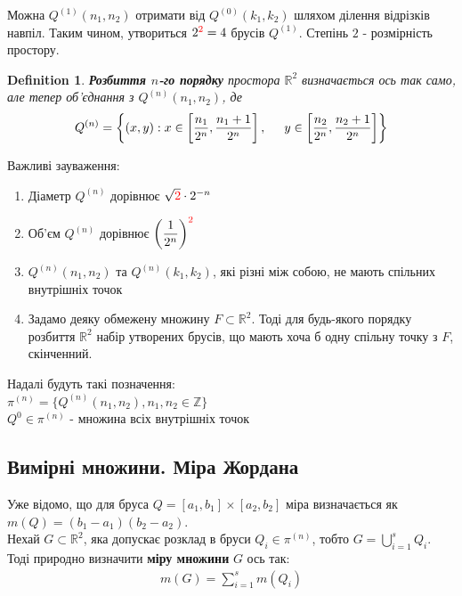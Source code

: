 \documentclass[a4paper, 10pt]{article}
\theoremstyle{theoremdd}
\theoremstyle{theoremdd}
\newtheorem{definition}[theorem]{Definition}
\theoremstyle{theoremdd}
\theoremstyle{theoremdd}
\theoremstyle{theoremdd}
\theoremstyle{theoremdd}
\theoremstyle{theoremdd}
\theoremstyle{theoremdd}
\begin{document}
Можна $Q^{(1)}(n_1,n_2)$ отримати від $Q^{(0)}(k_1,k_2)$ шляхом ділення відрізків навпіл. Таким чином, утвориться $2^{\textcolor{red}{2}} = 4$ брусів $Q^{(1)}$. Степінь $2$ - розмірність простору.

\begin{definition}
\textbf{Розбиття $n$-го порядку} простора $\mathbb{R}^2$ визначається ось так само, але тепер об'єднання з $Q^{(n)}(n_1,n_2)$, де
\begin{align*}
Q^{(n)} = \left\{ (x,y): x \in \left[\dfrac{n_1}{2^n},\dfrac{n_1+1}{2^n} \right], \hspace{0.5cm} y \in \left[\dfrac{n_2}{2^n},\dfrac{n_2+1}{2^n} \right] \right\}
\end{align*}
\end{definition}

Важливі зауваження:
\begin{enumerate}
\item Діаметр $Q^{(n)}$ дорівнює $\sqrt{\textcolor{red}{2}} \cdot 2^{-n}$
\item Об'єм $Q^{(n)}$ дорівнює $\left( \dfrac{1}{2^n} \right)^{\textcolor{red}{2}}$
\item $Q^{(n)}(n_1,n_2)$ та $Q^{(n)}(k_1,k_2)$, які різні між собою, не мають спільних внутрішніх точок
\item Задамо деяку обмежену множину $F \subset \mathbb{R}^2$. Тоді для будь-якого порядку розбиття $\mathbb{R}^2$ набір утворених брусів, що мають хоча б одну спільну точку з $F$, скінченний.
\end{enumerate}

Надалі будуть такі позначення:\\
$\pi^{(n)} = \{ Q^{(n)}(n_1,n_2), n_1,n_2 \in \mathbb{Z}\}$\\
$Q^0 \in \pi^{(n)}$ - множина всіх внутрішніх точок

\subsection{Вимірні множини. Міра Жордана}
Уже відомо, що для бруса $Q = [a_1,b_1] \times [a_2,b_2]$ міра визначається як $m(Q) = (b_1-a_1)(b_2-a_2)$.
\bigskip \\
Нехай $G \subset \mathbb{R}^2$, яка допускає розклад в бруси $Q_i \in \pi^{(n)}$, тобто $G = \displaystyle\bigcup_{i=1}^s Q_i$. Тоді природно визначити \textbf{міру множини} $G$ ось так:
\begin{align*}
m(G) = \sum_{i=1}^s m(Q_i)
\end{align*}
\end{document}
